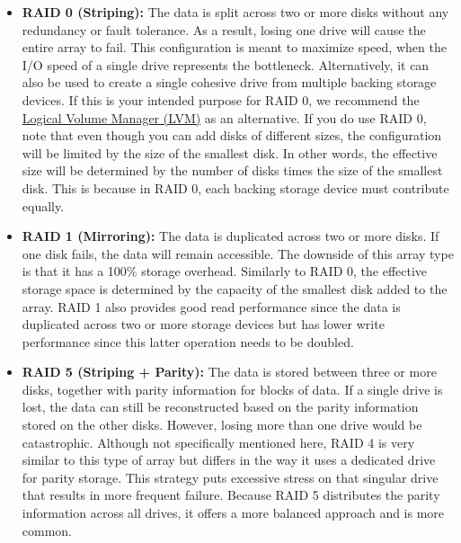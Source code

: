 \begin{itemize}
    \item \textbf{RAID 0 (Striping):} The data is split across two or more disks
          without any redundancy or fault tolerance. As a result, losing one
          drive will cause the entire array to fail. This configuration is meant
          to maximize speed, when the I/O speed of a single drive represents
          the bottleneck. Alternatively, it can also be used to create a single
          cohesive drive from multiple backing storage devices. If this is your
          intended purpose for RAID 0, we recommend the
          \href{https://wiki.archlinux.org/title/LVM}{Logical Volume Manager
          (LVM)} as an alternative. If you do use RAID 0, note that even though
          you can add disks of different sizes, the configuration will be
          limited by the size of the smallest disk. In other words, the
          effective size will be determined by the number of disks times the
          size of the smallest disk. This is because in RAID 0, each backing
          storage device must contribute equally.

    \item \textbf{RAID 1 (Mirroring):} The data is duplicated across two or
          more disks. If one disk fails, the data will remain accessible. The
          downside of this array type is that it has a 100\% storage overhead.
          Similarly to RAID 0, the effective storage space is determined by the
          capacity of the smallest disk added to the array. RAID 1 also provides
          good read performance since the data is duplicated across two or more
          storage devices but has lower write performance since this latter
          operation needs to be doubled.

    \item \textbf{RAID 5 (Striping + Parity):} The data is stored between three
          or more disks, together with parity information for blocks of data.
          If a single drive is lost, the data can still be reconstructed based
          on the parity information stored on the other disks. However, losing
          more than one drive would be catastrophic. Although not specifically
          mentioned here, RAID 4 is very similar to this type of array but
          differs in the way it uses a dedicated drive for parity storage. This
          strategy puts excessive stress on that singular drive that results in
          more frequent failure. Because RAID 5 distributes the parity
          information across all drives, it offers a more balanced approach and
          is more common.


\end{itemize}
